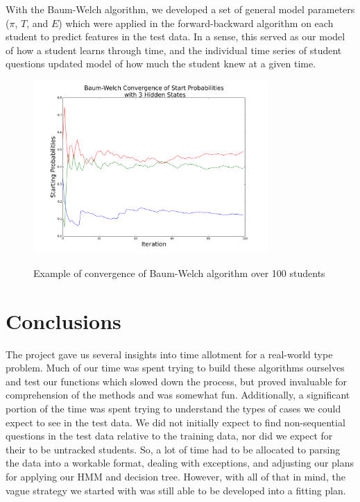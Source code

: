 \documentclass{article} %
\begin{document}
With the Baum-Welch algorithm, we developed a set of general model parameters ($\pi$, $T$, and $E$) which were applied in the forward-backward algorithm on each student to predict features in the test data. In a sense, this served as our model of how a student learns through time, and the individual time series of student questions updated model of how much the student knew at a given time.

\begin{figure}[h]
\begin{center}
	\includegraphics[width=0.8\textwidth]{bwConv3a.png}
	\label{fig:sgdbw}
\end{center}
\caption{Example of convergence of Baum-Welch algorithm over 100 students}
\end{figure}

\section{Conclusions}

The project gave us several insights into time allotment for a real-world type problem. Much of our time was spent trying to build these algorithms ourselves and test our functions which slowed down the process, but proved invaluable for comprehension of the methods and was somewhat fun. Additionally, a significant portion of the time was spent trying to understand the types of cases we could expect to see in the test data. We did not initially expect to find non-sequential questions in the test data relative to the training data, nor did we expect for their to be untracked students. So, a lot of time had to be allocated to parsing the data into a workable format, dealing with exceptions, and adjusting our plans for applying our HMM and decision tree. However, with all of that in mind, the vague strategy we started with was still able to be developed into a fitting plan.
\end{document}
